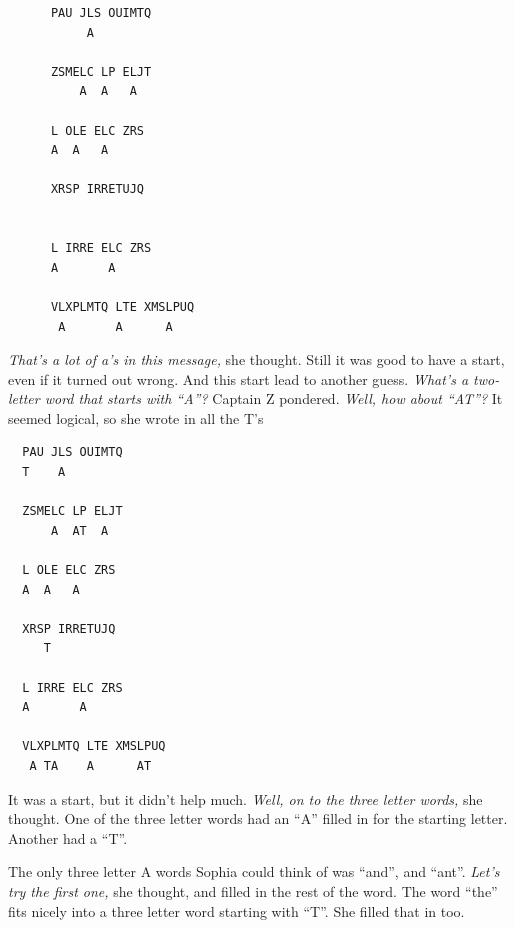\documentclass[12pt]{extbook}
\begin{document}
  \textcolor{Grayr}{}
  
  \textcolor{Black}{}
  
  \textcolor{Grayr}{}
  
  \textcolor{Grayr}{}
  
  \textcolor{Grayr}{}
  
  \textcolor{Grayr}{}
  
  \textcolor{Grayr}{}
  
  \begin{lstlisting}
      PAU JLS OUIMTQ
           A
  
      ZSMELC LP ELJT
          A  A   A
  
      L OLE ELC ZRS
      A  A   A
  
      XRSP IRRETUJQ
  
  
      L IRRE ELC ZRS
      A       A
  
      VLXPLMTQ LTE XMSLPUQ
       A       A      A
  \end{lstlisting}
  
  \emph{That's a lot of a's in this message,} she thought. Still it was
  good to have a start, even if it turned out wrong. And this start lead
  to another guess. \emph{What's a two-letter word that starts with
  \enquote{A}?} Captain Z pondered. \emph{Well, how about \enquote{AT}?}
  It seemed logical, so she wrote in all the T's
  
  \begin{lstlisting}
  PAU JLS OUIMTQ
  T    A
  
  ZSMELC LP ELJT
      A  AT  A
  
  L OLE ELC ZRS
  A  A   A
  
  XRSP IRRETUJQ
     T
  
  L IRRE ELC ZRS
  A       A
  
  VLXPLMTQ LTE XMSLPUQ
   A TA    A      AT
  \end{lstlisting}
  
  It was a start, but it didn't help much. \emph{Well, on to the three
  letter words,} she thought. One of the three letter words had an
  \enquote{A} filled in for the starting letter. Another had a
  \enquote{T}.
  
  The only three letter A words Sophia could think of was \enquote{and},
  and \enquote{ant}. \emph{Let's try the first one,} she thought, and
  filled in the rest of the word. The word \enquote{the} fits nicely into
  a three letter word starting with \enquote{T}. She filled that in too.
  
\end{document}
